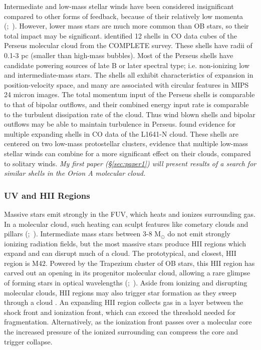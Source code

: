 Intermediate and low-mass stellar winds have been considered insignificant compared to other forms of feedback, because of their relatively low momenta (\citet{Vink01};~\citet{Smith14a}). However, lower mass stars are much more common than OB stars, so their total impact may be significant. \cite{Arce_2011} identified 12 shells in CO data cubes of the Perseus molecular cloud from the COMPLETE survey. These shells have radii of 0.1-3 pc (smaller than high-mass bubbles). Most of the Perseus shells have candidate powering sources of late B or later spectral type; i.e. non-ionizing low and intermediate-mass stars. The shells all exhibit characteristics of expansion in position-velocity space, and many are associated with circular features in MIPS 24 micron images. The total momentum input of the Perseus shells is comparable to that of bipolar outflows, and their combined energy input rate is comparable to the turbulent dissipation rate of the cloud. Thus wind blown shells and bipolar outflows may be able to maintain turbulence in Perseus. \cite{Nakamura12} found evidence for multiple expanding shells in CO data of the L1641-N cloud. These shells are centered on two low-mass protostellar clusters, evidence that multiple low-mass stellar winds can combine for a more significant effect on their clouds, compared to solitary winds. \textit{My first paper (\S\ref{sec:paper1}) will present results of a search for similar shells in the Orion A molecular cloud.}

\subsubsection{UV and HII Regions}\label{sec:uv}
Massive stars emit strongly in the FUV, which heats and ionizes surrounding gas. In a molecular cloud, such heating can sculpt features like cometary clouds and pillars (\citet{1983A&A...117..183R};~\citet{Walawender04}). Intermediate mass stars between 3-8 M$_\odot$ do not emit strongly ionizing radiation fields, but the most massive stars produce HII regions which expand and can disrupt much of a cloud. The prototypical, and closest, HII region is M42. Powered by the Trapezium cluster of OB stars, this HII region has carved out an opening in its progenitor molecular cloud, allowing a rare glimpse of forming stars in optical wavelengths (\citet{Odell93};~\citet{Ricci_2008}). Aside from ionizing and disrupting molecular clouds, HII regions may also trigger star formation as they sweep through a cloud \cite{Deharveng_2010}. An expanding HII region collects gas in a layer between the shock front and ionization front, which can exceed the threshold needed for fragmentation. Alternatively, as the ionization front passes over a molecular core the increased pressure of the ionized surrounding can compress the core and trigger collapse.

